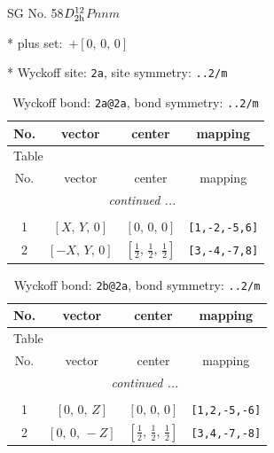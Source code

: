 \documentclass[fleqn,8pt]{jsarticle}
\begin{document}
\setcounter{MaxMatrixCols}{32}

\renewcommand{\tablename}{Table~}
\renewcommand{\figurename}{Figure~}
\begin{center}
\LARGE
SG No. 58\quad$D_{\rm 2h}^{12}$\quad$Pnnm$\quad[ orthorhombic ]
\end{center}

* plus set:\,\,\,$+\left[ 0,\, 0,\, 0 \right]$


* Wyckoff site: {\tt 2a}, site symmetry: {\tt ..2/m}
\renewcommand{\arraystretch}{1.2}
\begin{longtable}{cccc}
\caption{Wyckoff bond: {\tt 2a@2a}, bond symmetry: {\tt ..2/m}}
 \\
 \hline \hline
No. & vector & center & mapping \\ \hline \endfirsthead

\multicolumn{3}{l}{\tablename\ \thetable{}} \\
 \hline \hline
No. & vector & center & mapping \\ \hline \endhead

 \hline \hline
\multicolumn{3}{r}{\footnotesize\it continued ...} \\ \endfoot

 \hline \hline
\multicolumn{3}{r}{} \\ \endlastfoot

1 & $\left[ X,\, Y,\, 0 \right]$ & $\left[ 0,\, 0,\, 0 \right]$ & {\tt [1,-2,-5,6]} \\ \hline
2 & $\left[ - X,\, Y,\, 0 \right]$ & $\left[ \frac{1}{2},\, \frac{1}{2},\, \frac{1}{2} \right]$ & {\tt [3,-4,-7,8]} \\
\end{longtable}
\renewcommand{\arraystretch}{1.2}
\begin{longtable}{cccc}
\caption{Wyckoff bond: {\tt 2b@2a}, bond symmetry: {\tt ..2/m}}
 \\
 \hline \hline
No. & vector & center & mapping \\ \hline \endfirsthead

\multicolumn{3}{l}{\tablename\ \thetable{}} \\
 \hline \hline
No. & vector & center & mapping \\ \hline \endhead

 \hline \hline
\multicolumn{3}{r}{\footnotesize\it continued ...} \\ \endfoot

 \hline \hline
\multicolumn{3}{r}{} \\ \endlastfoot

1 & $\left[ 0,\, 0,\, Z \right]$ & $\left[ 0,\, 0,\, 0 \right]$ & {\tt [1,2,-5,-6]} \\ \hline
2 & $\left[ 0,\, 0,\, - Z \right]$ & $\left[ \frac{1}{2},\, \frac{1}{2},\, \frac{1}{2} \right]$ & {\tt [3,4,-7,-8]} \\
\end{longtable}
\end{document}
